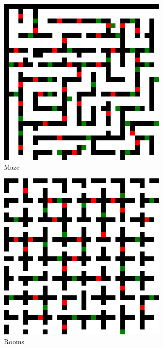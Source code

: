 \documentclass[letterpaper]{article} %
\def\
UrlFont{\rm}  %
\theoremstyle{definition}
\begin{document}
\begin{figure}[t]
        \centering
    \begin{subfigure}[b]{0.32\columnwidth}\centering
      \includegraphics[scale=0.3]{Figures/maze-32-32-2.map.png}
      \caption{Maze}
    \end{subfigure}
    \begin{subfigure}[b]{0.32\columnwidth}\centering
      \includegraphics[scale=.3]{Figures/room-32-32-4.map.png}
      \caption{Rooms}
    \end{subfigure}
    \begin{subfigure}[b]{0.32\columnwidth}\centering

\end{subfigure}
\end{figure}
\end{document}
